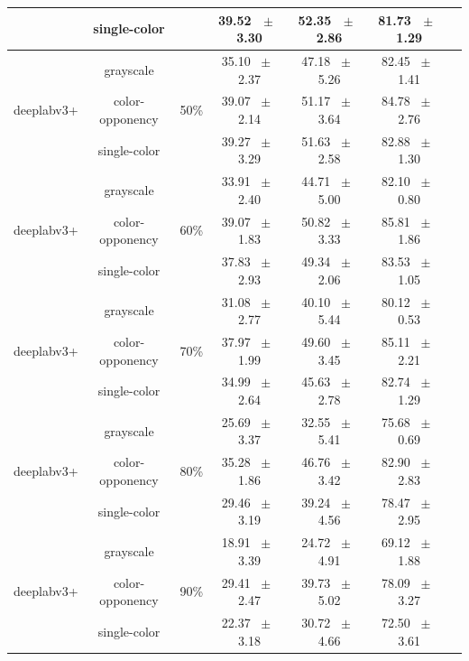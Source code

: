 \begin{table}[h]
\begin{tabular}{@{}lccc ccc@{}}
    & single-color &  & 39.52 ~$\pm$~ 3.30 & 52.35 ~$\pm$~ 2.86 & 81.73 ~$\pm$~ 1.29 \\
    \midrule
    \multirow{3}{*}{deeplabv3+} & grayscale & \multirow{3}{*}{50\%} & 35.10 ~$\pm$~ 2.37 & 47.18 ~$\pm$~ 5.26 & 82.45 ~$\pm$~ 1.41 \\
    & color-opponency &  & 39.07 ~$\pm$~ 2.14 & 51.17 ~$\pm$~ 3.64 & 84.78 ~$\pm$~ 2.76 \\
    & single-color &  & 39.27 ~$\pm$~ 3.29 & 51.63 ~$\pm$~ 2.58 & 82.88 ~$\pm$~ 1.30 \\
    \midrule
    \multirow{3}{*}{deeplabv3+} & grayscale & \multirow{3}{*}{60\%} & 33.91 ~$\pm$~ 2.40 & 44.71 ~$\pm$~ 5.00 & 82.10 ~$\pm$~ 0.80 \\
    & color-opponency &  & 39.07 ~$\pm$~ 1.83 & 50.82 ~$\pm$~ 3.33 & 85.81 ~$\pm$~ 1.86 \\
    & single-color &  & 37.83 ~$\pm$~ 2.93 & 49.34 ~$\pm$~ 2.06 & 83.53 ~$\pm$~ 1.05 \\
    \midrule
    \multirow{3}{*}{deeplabv3+} & grayscale & \multirow{3}{*}{70\%} & 31.08 ~$\pm$~ 2.77 & 40.10 ~$\pm$~ 5.44 & 80.12 ~$\pm$~ 0.53 \\
    & color-opponency &  & 37.97 ~$\pm$~ 1.99 & 49.60 ~$\pm$~ 3.45 & 85.11 ~$\pm$~ 2.21 \\
    & single-color &  & 34.99 ~$\pm$~ 2.64 & 45.63 ~$\pm$~ 2.78 & 82.74 ~$\pm$~ 1.29 \\
    \midrule
    \multirow{3}{*}{deeplabv3+} & grayscale & \multirow{3}{*}{80\%} & 25.69 ~$\pm$~ 3.37 & 32.55 ~$\pm$~ 5.41 & 75.68 ~$\pm$~ 0.69 \\
    & color-opponency &  & 35.28 ~$\pm$~ 1.86 & 46.76 ~$\pm$~ 3.42 & 82.90 ~$\pm$~ 2.83 \\
    & single-color &  & 29.46 ~$\pm$~ 3.19 & 39.24 ~$\pm$~ 4.56 & 78.47 ~$\pm$~ 2.95 \\
    \midrule
    \multirow{3}{*}{deeplabv3+} & grayscale & \multirow{3}{*}{90\%} & 18.91 ~$\pm$~ 3.39 & 24.72 ~$\pm$~ 4.91 & 69.12 ~$\pm$~ 1.88 \\
    & color-opponency &  & 29.41 ~$\pm$~ 2.47 & 39.73 ~$\pm$~ 5.02 & 78.09 ~$\pm$~ 3.27 \\
    & single-color &  & 22.37 ~$\pm$~ 3.18 & 30.72 ~$\pm$~ 4.66 & 72.50 ~$\pm$~ 3.61 \\
    \midrule
    \bottomrule
  \end{tabular}
  \label{tab:sparse_results_deeplabv3+_acdc_rain}
\end{table}